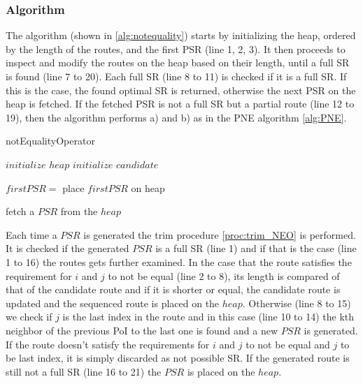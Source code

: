 \subsubsection{Algorithm}
\label{sec:algortihmNEO}
The algorithm (shown in \ref{alg:notequality}) starts by initializing the heap, ordered by the length of the routes, and the first PSR (line 1, 2, 3). It then proceeds to inspect and modify the routes on the heap based on their length, until a full SR is found (line 7 to 20). Each full SR (line 8 to 11) is checked if it is a full SR. If this is the case, the found optimal SR is returned, otherwise the next PSR on the heap is fetched. If the fetched PSR is not a full SR but a partial route (line 12 to 19), then the algorithm performs a) and b) as in the PNE algorithm \ref{alg:PNE}. \newline

\begin{algorithm}[H]
	\label{alg:notequality}
	\caption{notEqualityOperator}
	
	\BlankLine
	
	$initialize$ $heap$\;
	$initialize$ $candidate$\;
	
	$firstPSR =$\;
	place $firstPSR$ on heap\;
	
	\BlankLine
	
	
	fetch a $PSR$ from the $heap$\;
	
\end{algorithm}

Each time a $PSR$ is generated the trim procedure \ref{proc:trim_NEO} is performed. It is checked if the generated $PSR$ is a full SR (line 1) and if that is the case (line 1 to 16) the routes gets further examined. In the case that the route satisfies the requirement for $i$ and $j$ to not be equal (line 2 to 8), its length is compared of that of the candidate route and if it is shorter or equal, the candidate route is updated and the sequenced route is placed on the $heap$. Otherwise (line 8 to 15) we check if $j$ is the last index in the route and in this case (line 10 to 14) the kth neighbor of the previous PoI to the last one is found and a new $PSR$ is generated. If the route doesn't satisfy the requirements for $i$ and $j$ to not be equal and $j$ to be last index, it is simply discarded as not possible SR.
If the generated route is still not a full SR (line 16 to 21) the $PSR$ is placed on the $heap$. \newline

